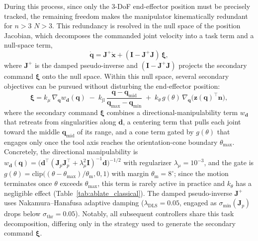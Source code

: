 \documentclass[journal, twoside]{IEEEtran}
\newcommand{\rst}[1]{{\color{rstcolor}#1}}
\begin{document}
During this process, since only the $3$-DoF end-effector position must be precisely tracked, the remaining freedom makes the manipulator kinematically redundant for \sout{$n>3$} \rst{$N>3$}. This redundancy is resolved in the null space of the position Jacobian, which decomposes the commanded joint velocity into a task term and a null-space term,
\begin{equation}
\label{eq:nullspace}
\dot{\mathbf{q}} = \mathbf{J}^{+}\dot{\mathbf{x}} + (\mathbf{I}-\mathbf{J}^{+}\mathbf{J})\,\boldsymbol{\xi},
\end{equation}
where $\mathbf{J}^{+}$ is the damped pseudo-inverse and $(\mathbf{I}-\mathbf{J}^{+}\mathbf{J})$ projects the secondary command $\boldsymbol{\xi}$ onto the null space. Within this null space, several secondary objectives can be pursued without disturbing the end-effector position:
\begin{equation}
\label{eq:secondary}
\boldsymbol{\xi}=k_{\mu}\,\nabla_{\mathbf{q}}w_{\mathbf{d}}(\mathbf{q})\;-\;k_{\mathrm{jl}}\,\frac{\mathbf{q}-\mathbf{q}_{\mathrm{mid}}}{\mathbf{q}_{\max}-\mathbf{q}_{\min}}\;+\;k_{\theta}\,g(\theta)\,\nabla_{\mathbf{q}}\!\big(\mathbf{z}(\mathbf{q})^{\top}\mathbf{n}\big),
\end{equation}
where the secondary command $\boldsymbol{\xi}$ combines a directional-manipulability term $w_{\mathbf{d}}$ that retreats from singularities along $\mathbf{d}$, a centering term that pulls each joint toward the middle $\mathbf{q}_{\mathrm{mid}}$ of its range, and a cone term gated by $g(\theta)$ that \rst{engages only once the tool axis reaches the orientation-cone boundary $\theta_{\max}$}. \rst{Concretely, the directional manipulability is $w_{\mathbf{d}}(\mathbf{q})=\big(\mathbf{d}^{\top}(\mathbf{J}_{p}\mathbf{J}_{p}^{\top}+\lambda_{\mu}^{2}\mathbf{I})^{-1}\mathbf{d}\big)^{-1/2}$ with regularizer $\lambda_{\mu}=10^{-3}$, and the gate is $g(\theta)=\mathrm{clip}\!\big((\theta-\theta_{\max})/\theta_{\mathrm{m}},0,1\big)$ with margin $\theta_{\mathrm{m}}=8^{\circ}$; since the motion terminates once $\theta$ exceeds $\theta_{\max}$, this term is rarely active in practice and $k_{\theta}$ has a negligible effect (Table~\ref{tab:ablate_classical}). The damped pseudo-inverse $\mathbf{J}^{+}$ uses Nakamura--Hanafusa adaptive damping ($\lambda_{\mathrm{DLS}}=0.05$, engaged as $\sigma_{\min}(\mathbf{J}_{p})$ drops below $\sigma_{\mathrm{thr}}=0.05$).} Notably, all subsequent controllers share this task decomposition, differing only in the strategy used to generate the secondary command $\boldsymbol{\xi}$.
\end{document}
